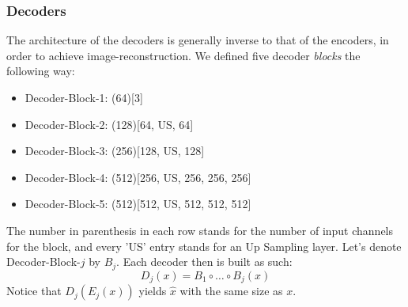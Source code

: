 \subsubsection{Decoders}\label{subsec:Decoders}
The architecture of the decoders is generally inverse to that of the encoders, in order to achieve image-reconstruction. We defined five decoder \textit{blocks} the following way:
\begin{itemize}
	\item Decoder-Block-1: (64)[3]
	\item Decoder-Block-2: (128)[64, US, 64]
	\item Decoder-Block-3: (256)[128, US, 128]
	\item Decoder-Block-4: (512)[256, US, 256, 256, 256]
	\item Decoder-Block-5: (512)[512, US, 512, 512, 512]
\end{itemize}
The number in parenthesis in each row stands for the number of input channels for the block, and every 'US' entry stands for an Up Sampling layer. Let's denote Decoder-Block-$j$ by $B_j$. Each decoder then is built as such:
\begin{equation}\label{eq:decoder}
D_j(x) = B_1 \circ \dots \circ B_j (x)
\end{equation}
Notice that $D_j(E_j(x))$ yields $\hat{x}$ with the same size as $x$.\\

